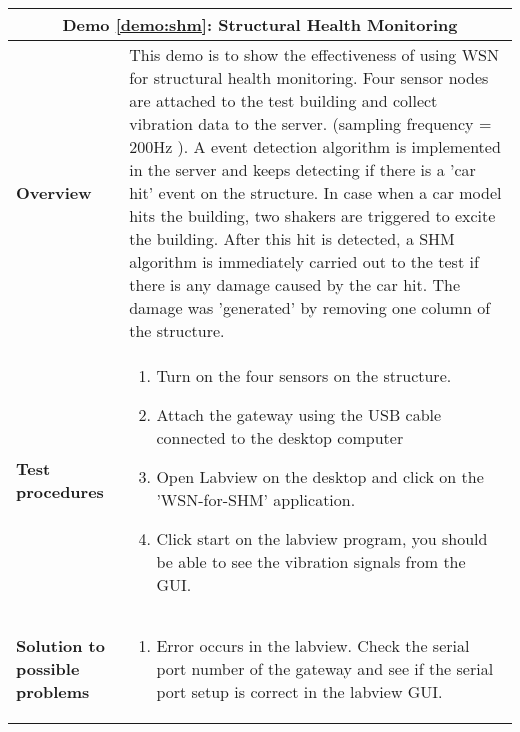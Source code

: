 \begin{center}
	\begin{tabular}{ | p{2cm} | p{10cm} | }
		\hline
		\multicolumn{2}{|c|}{\textbf{Demo \ref{demo:shm}: Structural Health Monitoring}} \\ \hline
		\textbf{Overview} &  This demo is to show the effectiveness of using WSN for structural health monitoring.  Four sensor nodes are attached to the test building and collect vibration data to the server. (sampling frequency = 200Hz ).
A event detection algorithm is implemented in the server and keeps detecting if there is a 'car hit' event on the structure. 
In case when a car model hits the building, two shakers are triggered to excite the building. After this hit is detected, a SHM algorithm is immediately carried out to the test if there is any damage caused by the car hit. The damage was 'generated' by removing one column of the structure. \\ \hline
		\textbf{Test procedures} &
		\begin{enumerate}
		\item Turn on the four sensors on the structure.
		\item Attach the gateway using the USB cable connected to the desktop computer
		\item Open Labview on the desktop and click on the 'WSN-for-SHM' application.
		\item Click start on the labview program, you should be able to see the vibration signals from the GUI.
		\end{enumerate} \\ \hline
		\textbf{Solution to possible problems} &
		\begin{enumerate}
		\item Error occurs in the labview. Check the serial port number of the gateway and see if the serial port setup is correct in the labview GUI.
		\end{enumerate}  \\
		\hline
	\end{tabular}
\end{center}


